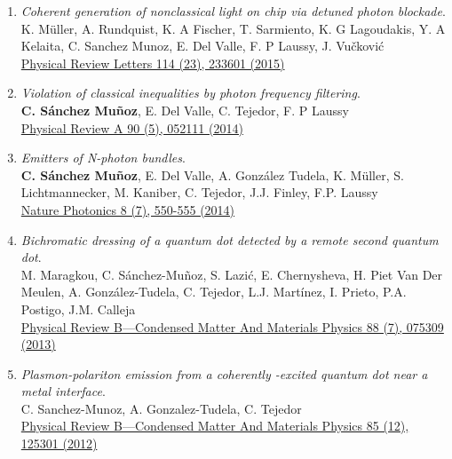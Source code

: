 \begin{enumerate}
 \item \emph{Coherent generation of nonclassical light on chip via detuned photon blockade}.\\ 
{K. Müller, A. Rundquist, K. A Fischer, T. Sarmiento, K. G Lagoudakis, Y. A Kelaita, C. Sanchez Munoz, E. Del Valle, F. P Laussy, J. Vučković}\\ 
  \href{https://journals.aps.org/prl/abstract/10.1103/PhysRevLett.114.233601}{{Physical Review Letters 114 (23), 233601 (2015)}}

 \item \emph{Violation of classical inequalities by photon frequency filtering}.\\ 
{\textbf{C. Sánchez Muñoz}, E. Del Valle, C. Tejedor, F. P Laussy}\\ 
  \href{https://journals.aps.org/pra/abstract/10.1103/PhysRevA.90.052111}{{Physical Review A 90 (5), 052111 (2014)}}

 \item \emph{Emitters of N-photon bundles}.\\ 
{\textbf{C. Sánchez Muñoz}, E. Del Valle, A. González Tudela, K. Müller, S. Lichtmannecker, M. Kaniber, C. Tejedor, J.J. Finley, F.P. Laussy}\\ 
  \href{https://www.nature.com/articles/nphoton.2014.114}{{Nature Photonics 8 (7), 550-555 (2014)}}

 \item \emph{Bichromatic dressing of a quantum dot detected by a remote second quantum dot}.\\ 
{M. Maragkou, C. Sánchez-Muñoz, S. Lazić, E. Chernysheva, H. Piet Van Der Meulen, A. González-Tudela, C. Tejedor, L.J. Martínez, I. Prieto, P.A. Postigo, J.M. Calleja}\\ 
  \href{https://journals.aps.org/prb/abstract/10.1103/PhysRevB.88.075309}{{Physical Review B—Condensed Matter And Materials Physics 88 (7), 075309 (2013)}}

 \item \emph{Plasmon-polariton emission from a coherently -excited quantum dot near a metal interface}.\\ 
{C. Sanchez-Munoz, A. Gonzalez-Tudela, C. Tejedor}\\ 
  \href{https://journals.aps.org/prb/abstract/10.1103/PhysRevB.85.125301}{{Physical Review B—Condensed Matter And Materials Physics 85 (12), 125301 (2012)}}

\end{enumerate}

